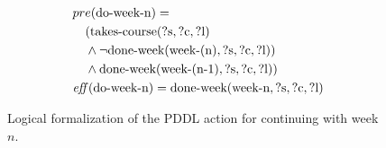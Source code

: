 \begin{figure}[t]
    \begin{align*}
    &pre(\text{do-week-n}) = \\
    &\quad ( \text{takes-course}(\text{?s}, \text{?c}, \text{?l}) \\
    &\quad \land \lnot \text{done-week}(\text{week-(n)}, \text{?s}, \text{?c}, \text{?l})) \\
    &\quad \land \text{done-week}(\text{week-(n-1)}, \text{?s}, \text{?c}, \text{?l}) ) \\
    &\mathit{eff}(\text{do-week-n}) = \text{done-week}(\text{week-n}, \text{?s}, \text{?c}, \text{?l})
    \end{align*}
    \caption{Logical formalization of the PDDL action for continuing with week $n$.}\label{fig:formalised-do-week-n}
\end{figure}